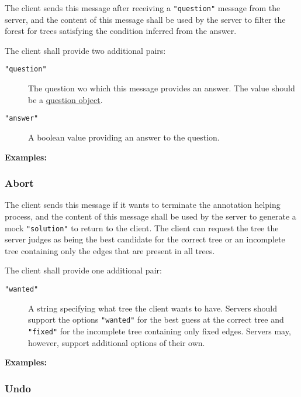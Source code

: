 \documentclass{scrartcl}
\newcommand{\jsstring}[1]{\texttt{\color{OrangeRed}"#1"}}
\newcommand{\Examples}{\noindent\textbf{Examples:}}
\begin{document}
The client sends this message after receiving a \jsstring{question} message from the server,
and the content of this message shall be used by the server to filter the forest for trees satisfying
the condition inferred from the answer.

The client shall provide two additional pairs:
\begin{description}
    \item[\jsstring{question}] The question wo which this message provides an answer.
        The value should be a \hyperref[ssub:Question object]{question object}.
    \item[\jsstring{answer}] A boolean value providing an answer to the question.
\end{description}

\Examples





\subsubsection{Abort}
\label{ssub:Abort}

The client sends this message if it wants to terminate the annotation helping process,
and the content of this message shall be used by the server to generate a mock \jsstring{solution} to return to the client.
The client can request the tree the server judges as being the best candidate for the correct tree or an incomplete tree containing only the edges that are present in all trees.

The client shall provide one additional pair:
\begin{description}
    \item[\jsstring{wanted}] A string specifying what tree the client wants to have.
        Servers should support the options \jsstring{wanted} for the best guess at the correct tree and \jsstring{fixed} for the incomplete tree containing only fixed edges.
        Servers may, however, support additional options of their own.
\end{description}

\Examples



\subsubsection{Undo}
\label{ssub:Undo}
\end{document}
